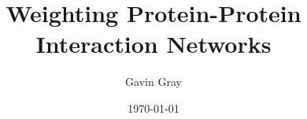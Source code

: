 \documentclass[12pt,oneside,abbrevs,dtc,mscres,neuro,notimes,logo]{styles/infthesis}
\title{Weighting Protein-Protein Interaction Networks}
\author{Gavin Gray}
\date{\today}
\begin{document}



  \begin{preliminary}
    \maketitle

    
    \standarddeclaration
    \tableofcontents
    \listoffigures
  \end{preliminary}

  
  
  
  
  

  \appendix

  
  
  

  \printbibliography
\end{document}
